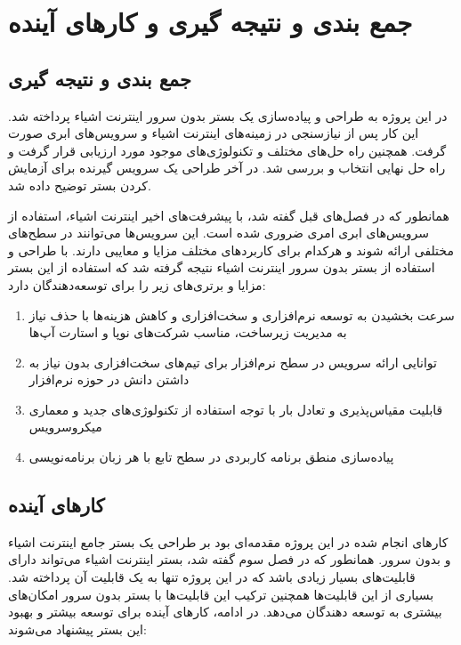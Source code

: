 \chapter{جمع بندی و نتیجه گیری و  کارهای آینده}\label{chapter4}

\section{جمع بندی و نتیجه گیری}

در این پروژه به طراحی و پیاده‌سازی یک بستر بدون سرور اینترنت اشیاء پرداخته شد. این کار پس از نیازسنجی در زمینه‌های اینترنت اشیاء و سرویس‌های ابری صورت گرفت. همچنین راه حل‌های مختلف و تکنولوژی‌های موجود مورد ارزیابی قرار گرفت و راه حل نهایی انتخاب و بررسی شد. در آخر طراحی یک سرویس گیرنده برای آزمایش کردن بستر توضیح داده شد.

همانطور که در فصل‌های قبل گفته شد، با پیشرفت‌های اخیر اینترنت اشیاء، استفاده از سرویس‌های ابری امری ضروری شده است. این سرویس‌ها می‌توانند در سطح‌های مختلفی ارائه شوند و هرکدام برای کاربردهای مختلف مزایا و معایبی دارند. با طراحی و استفاده از بستر بدون سرور اینترنت اشیاء نتیجه گرفته شد که استفاده از این بستر مزایا و برتری‌های زیر را برای توسعه‌دهندگان دارد: 

\begin{enumerate}
	
	\item سرعت بخشیدن به توسعه نرم‌افزاری و سخت‌افزاری و کاهش هزینه‌ها با حذف نیاز به مدیریت زیرساخت، مناسب شرکت‌های نوپا و استارت آپ‌ها
	
	\item توانایی ارائه‌ سرویس در سطح نرم‌افزار برای تیم‌های سخت‌افزاری بدون نیاز به داشتن دانش در حوزه نرم‌افزار
	
	\item قابلیت مقیاس‌پذیری و تعادل بار با توجه استفاده از تکنولوژی‌های جدید و معماری میکروسرویس
	
	\item پیاده‌سازی منطق برنامه کاربردی در سطح تابع با هر زبان برنامه‌نویسی
	
\end{enumerate}

\section{کارهای آینده}

کارهای انجام شده در این پروژه مقدمه‌ای بود بر طراحی یک بستر جامع اینترنت اشیاء و بدون سرور. همانطور که در فصل سوم گفته شد، بستر اینترنت اشیاء می‌تواند دارای قابلیت‌های بسیار زیادی باشد که در این پروژه تنها به یک قابلیت آن پرداخته شد. بسیاری از این قابلیت‌ها  همچنین ترکیب این قابلیت‌ها با بستر بدون سرور امکان‌های بیشتری به توسعه دهندگان می‌دهد. در ادامه، کارهای آینده برای توسعه بیشتر و بهبود این بستر پیشنهاد می‌شوند:

